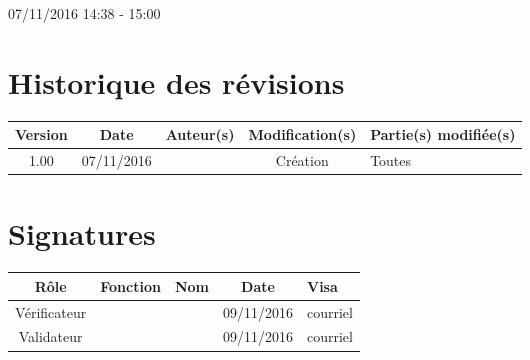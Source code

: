\documentclass [a4paper] {article}
\begin{document}
07/11/2016			 				%
\hfill   
\hfill 	 14:38 - 15:00				%



\section*{Historique des révisions}
\begin{center}
			\begin{tabular}{| c | c | c | c | p{4cm} |}
				\hline
				\rowcolor{Gray}
				Version & Date & Auteur(s) & Modification(s) & Partie(s) modifiée(s)		 \\
				\hline
				1.00 & 07/11/2016 & \Kafui & Création & Toutes \\
		\hline		
			\end{tabular}
		\end{center}

\section*{Signatures}

		\begin{center}
			\begin{tabular}{| c | c | c | c | p{4cm} |}
				\hline
				\rowcolor{Gray}
				Rôle & Fonction & Nom & Date & Visa		 \\
				\hline
				Vérificateur & \RQ & \Melissa & 09/11/2016 & courriel \\[30pt]
				\hline
				Validateur & \CP & \Pierre & 09/11/2016 & courriel \\[30pt]	
				\hline
			\end{tabular}
		\end{center}
\end{document}
